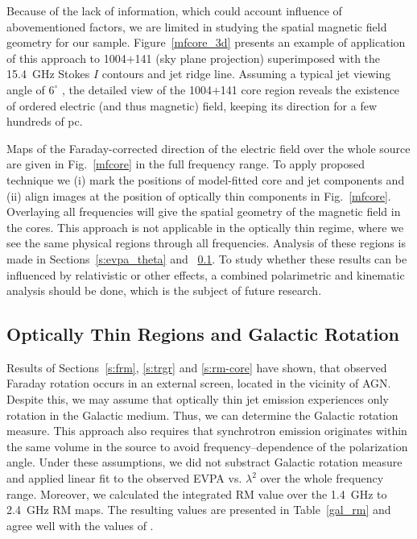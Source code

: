 \documentclass[a4paper,fleqn,usenatbib,useAMS]{mnras}
\begin{document}
Because of the lack of information, which could account influence of abovementioned factors, we are limited in studying the spatial magnetic field geometry for our sample. 
Figure~\ref{mfcore_3d} presents an example of application of this approach to 1004$+$141 (sky plane projection) superimposed with the 15.4~GHz Stokes $I$ contours and jet ridge line.
Assuming a typical jet viewing angle of $6^\circ$ \citep{savolainen_etal10,pushkarev_etal15,2014MNRAS.441.1899F}, the detailed view of the 1004$+$141 core region reveals the existence of ordered electric (and thus magnetic) field, keeping its direction for a few hundreds of pc.

Maps of the Faraday-corrected direction of the electric field over the whole source are given in Fig.~\ref{mfcore} in the full frequency range. 
To apply proposed technique we (i) mark the positions of model-fitted core and jet components and (ii) align images at the position of optically thin components in Fig.~\ref{mfcore}.
Overlaying all frequencies will give the spatial geometry of the magnetic field in the cores.
This approach is not applicable in the optically thin regime, where we see the same physical regions through all frequencies. 
Analysis of these regions is made in Sections~\ref{s:evpa_theta} and ~\ref{s:gfrm}.
To study whether these results can be influenced by relativistic or other effects, a combined polarimetric and kinematic analysis should be done, which is the subject of future research.




\subsection{Optically Thin Regions and Galactic Rotation}
\label{s:gfrm}

Results of Sections~\ref{s:frm}, \ref{s:trgr} and \ref{s:rm-core} have shown, that observed Faraday rotation occurs in an external screen, located in the vicinity of AGN. Despite this, we may assume that optically thin jet emission experiences only rotation in the Galactic medium. 
Thus, we can determine the Galactic rotation measure.
This approach also requires that synchrotron emission originates within the same volume in the source to avoid frequency--dependence of the polarization angle.
Under these assumptions, we did not substract Galactic rotation measure and applied linear fit to the observed EVPA vs. $\lambda^2$ over the whole frequency range.
Moreover, we calculated the integrated RM value over the 1.4~GHz to 2.4~GHz RM maps.
The resulting values are presented in Table~\ref{gal_rm} and agree well with the values of \citet{taylor_etal09}.
\end{document}
